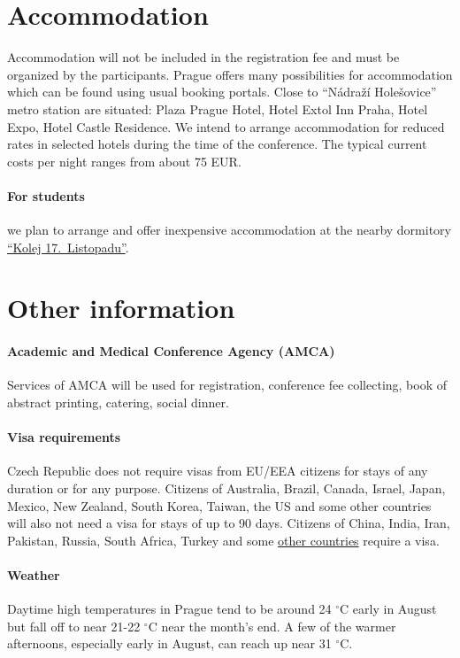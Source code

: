 \documentclass[12pt]{extarticle}
\begin{document}
\section*{Accommodation}
\noindent
Accommodation will not be included in the registration fee and must be organized by the participants.
Prague offers many possibilities for accommodation which can be found using usual booking portals. Close
to “Nádraží Holešovice” metro station are situated: Plaza Prague Hotel, Hotel Extol Inn Praha, Hotel Expo, Hotel
Castle Residence. We intend to arrange accommodation for reduced rates in selected hotels during the time of
the conference. The typical current costs per night ranges from about 75 EUR.

\paragraph{For students} we plan to arrange and offer inexpensive accommodation at the nearby dormitory \href{https://kam.cuni.cz/KAMEN-54.html}{``Kolej 17.\ Listopadu''}.

\section*{Other information}

\paragraph{Academic and Medical Conference Agency (AMCA)}
Services of AMCA will be used for registration, conference fee
collecting, book of abstract printing, catering, social dinner.

\paragraph{Visa requirements}
Czech Republic does not require visas from EU/EEA citizens for stays
of any duration or for any purpose. Citizens of Australia, Brazil,
Canada, Israel, Japan, Mexico, New Zealand, South Korea, Taiwan, the
US and some other countries will also not need a visa for stays of
up to 90 days. Citizens of China, India, Iran, Pakistan, Russia, South
Africa, Turkey and some
\href{https://www.mzv.cz/jnp/en/information_for_aliens/short_stay_visa/list_of_states_whose_citizens_are/index.html}{other countries} require a visa.

\paragraph{Weather}
Daytime high temperatures in Prague tend to be around 24 ${}^\circ$C early in August but fall off to near
21-22 ${}^\circ$C near the month's end. A few of the warmer afternoons, especially early in August, can reach
up near 31 ${}^\circ$C.
\end{document}
